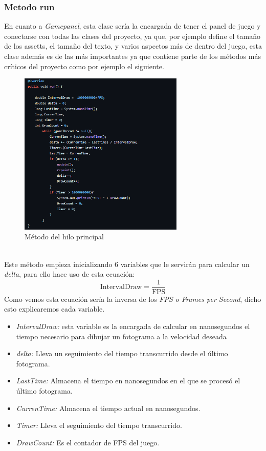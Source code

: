 \documentclass[a4paper]{article}
\begin{document}
\subsubsection{Metodo run}
En cuanto a \textit{Gamepanel}, esta clase sería la encargada de tener el panel de juego y conectarse con todas las clases del proyecto, ya que, por ejemplo define
el tamaño de los assetts, el tamaño del texto, y varios aspectos más de dentro del juego, esta clase además es de las más importantes ya que contiene parte de los métodos más críticos del proyecto como por ejemplo el siguiente.\\
\begin{figure}[ht]
    \centering
    \includegraphics[width=0.7\textwidth]{Images/fpsMethod.PNG}
    \caption{Método del hilo principal}
    \label{fig:metodohiloprincipal}
\end{figure}
\\
Este método empieza inicializando 6 variables que le servirán para calcular un \textit{delta}, para ello hace uso de esta ecuación:
$$\text{IntervalDraw} = \frac{1}{\text{FPS}}$$
Como vemos esta ecuación sería la inversa de los \textit{FPS o Frames per Second}, dicho esto explicaremos cada variable.
\begin{itemize}
    \item \textit{IntervalDraw:} esta variable es la encargada de calcular en nanosegundos el tiempo necesario para dibujar un fotograma a la velocidad deseada
    \item \textit{delta:} Lleva un seguimiento del tiempo transcurrido desde el último fotograma.
    \item \textit{LastTime:} Almacena el tiempo en nanosegundos en el que se procesó el último fotograma.
    \item \textit{CurrenTime:} Almacena el tiempo actual en nanosegundos.
    \item \textit{Timer:} Lleva el seguimiento del tiempo transcurrido.
    \item \textit{DrawCount:} Es el contador de FPS del juego.
\end{itemize}
\end{document}
